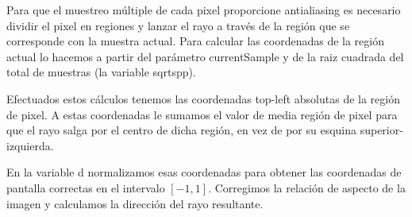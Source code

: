 \medskip

Para que el muestreo múltiple de cada pixel proporcione antialiasing es necesario dividir el pixel en regiones y lanzar el rayo a través de la región que se corresponde con la muestra actual. Para calcular las coordenadas de la región actual lo hacemos a partir del parámetro currentSample y de la raiz cuadrada del total de muestras (la variable sqrtspp).

\medskip

Efectuados estos cálculos tenemos las coordenadas top-left absolutas de la región de pixel. A estas coordenadas le sumamos el valor de media región de pixel para que el rayo salga por el centro de dicha región, en vez de por su esquina superior-izquierda.

\medskip

En la variable d normalizamos esas coordenadas para obtener las coordenadas de pantalla correctas en el intervalo $[-1, 1]$. Corregimos la relación de aspecto de la imagen y calculamos la dirección del rayo resultante.




